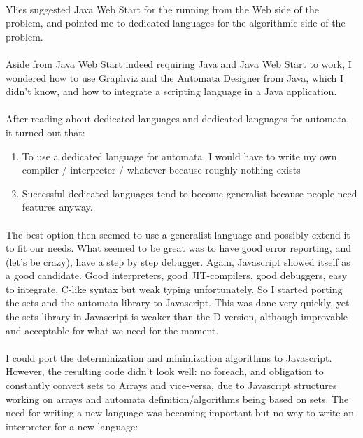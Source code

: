 \documentclass{article}
\begin{document}
\begin{sloppypar}
   
\paragraph{}
Ylies suggested Java Web Start for the running from the Web side of the problem, and pointed me to dedicated languages for the algorithmic side of the problem.

   
\paragraph{}
Aside from Java Web Start indeed requiring Java and Java Web Start to work, I wondered how to use Graphviz and the Automata Designer from Java, which I didn't know, and how to integrate a scripting language in a Java application.

   
\paragraph{}
After reading about dedicated languages and dedicated languages for automata, it turned out that:
    
\begin{enumerate}
	\item{ To use a dedicated language for automata, I would have to write my own compiler / interpreter / whatever because roughly nothing exists}
	\item{ Successful dedicated languages tend to become generalist because people need features anyway.}
\end{enumerate}

\paragraph{}
The best option then seemed to use a generalist language and possibly extend it to fit our needs. What seemed to be great was to have good error reporting, and (let's be crazy), have a step by step debugger. Again, Javascript showed itself as a good candidate. Good interpreters, good JIT-compilers, good debuggers, easy to integrate, C-like syntax but weak typing unfortunately. So I started porting the sets and the automata library to Javascript. This was done very quickly, yet the sets library in Javascript is weaker than the D version, although improvable and acceptable for what we need for the moment.

   
\paragraph{}
I could port the determinization and minimization algorithms to Javascript. However, the resulting code didn't look well: no foreach, and obligation to constantly convert sets to Arrays and vice-versa, due to Javascript structures working on arrays and automata definition/algorithms being based on sets. The need for writing a new language was becoming important but no way to write an interpreter for a new language:
    

\end{sloppypar}
\end{document}
